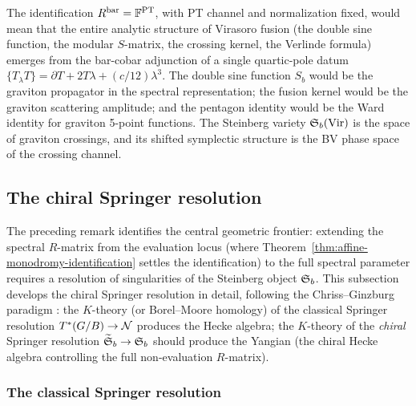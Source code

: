 \begin{remark}
\label{rem:graviton-braiding}
The identification $R^{\mathrm{bar}} = \mathbb{F}^{\mathrm{PT}}$, with PT
channel and normalization fixed, would
mean that the entire analytic structure of Virasoro fusion
(the double sine function, the modular $S$-matrix, the crossing
kernel, the Verlinde formula) emerges from the bar-cobar
adjunction of a single quartic-pole datum $\{T_\lambda T\} =
\partial T + 2T\lambda + (c/12)\lambda^3$. The double sine
function $S_b$ would be the graviton propagator in the spectral
representation; the fusion kernel would be the graviton scattering
amplitude; and the pentagon identity would be the Ward identity for
graviton 5-point functions. The Steinberg variety
$\mathfrak{S}_b(\mathrm{Vir})$ is the space of graviton crossings,
and its shifted symplectic structure is the BV phase space of the
crossing channel.
\end{remark}


\subsection{The chiral Springer resolution}
\label{subsec:chiral-springer-resolution}

The preceding remark identifies the central geometric frontier:
extending the spectral $R$-matrix from the evaluation locus (where
Theorem~\ref{thm:affine-monodromy-identification} settles the
identification) to the full spectral parameter requires a resolution
of singularities of the Steinberg object $\mathfrak{S}_b$. This
subsection develops the chiral Springer resolution in detail,
following the Chriss--Ginzburg paradigm
\cite{ChrissGinzburg}: the $K$-theory (or Borel--Moore homology) of
the classical Springer resolution $T^*(G/B) \to \mathcal{N}$ produces the
Hecke algebra; the $K$-theory of the \emph{chiral} Springer resolution
$\widetilde{\mathfrak{S}}_b \to \mathfrak{S}_b$ should produce the Yangian
(the chiral Hecke algebra controlling the full
non-evaluation $R$-matrix).

\subsubsection{The classical Springer resolution}
\label{sssec:classical-springer-review}

